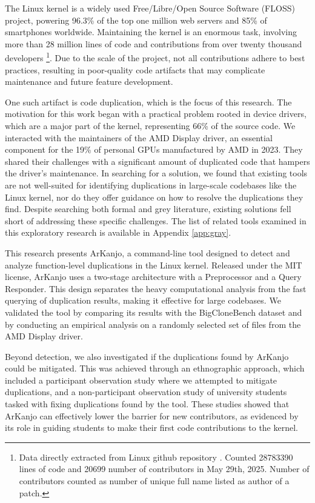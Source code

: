 \en

The Linux kernel is a widely used Free/Libre/Open Source Software (FLOSS) project, 
powering 96.3\% of the top one million web servers and 85\% of smartphones worldwide. 
Maintaining the kernel is an enormous task, involving more than 28 million lines of 
code and contributions from over twenty thousand developers
\footnote{Data directly extracted from Linux github repository \citep{linuxrepo}.
Counted  28783390 lines of code and 20699 number of contributors in May 29th, 2025.
Number of contributors counted as number of unique full name listed as author of a patch.}.
Due to the scale of the project, not all contributions adhere to best practices, resulting 
in poor-quality code artifacts that may complicate maintenance and future feature development.

One such artifact is code duplication, which is the focus of this research. The motivation for 
this work began with a practical problem rooted in device drivers, which are a major part 
of the kernel, representing 66\% of the source code\citep{marcelo}. We interacted with the 
maintainers of the AMD Display driver, an essential component for the 19\% of personal GPUs 
manufactured by AMD in 2023\citep{gpumarket}. They shared their challenges with a significant 
amount of duplicated code that hampers the driver's maintenance. In searching for a solution, 
we found that existing tools are not well-suited for identifying duplications in large-scale 
codebases like the Linux kernel, nor do they offer guidance on how to resolve the duplications 
they find. Despite searching both formal and grey literature, existing solutions fell short of 
addressing these specific challenges. The list of related tools examined in this exploratory 
research is available in Appendix \ref{app:gray}.

This research presents ArKanjo, a command-line tool designed to detect and analyze function-level 
duplications in the Linux kernel. Released under the MIT license, ArKanjo uses a two-stage 
architecture with a Preprocessor and a Query Responder. This design separates the heavy 
computational analysis from the fast querying of duplication results, making it effective for 
large codebases. We validated the tool by comparing its results with the BigCloneBench dataset
\citep{bigclonebench} and by conducting an empirical analysis on a randomly selected set of 
files from the AMD Display driver.

Beyond detection, we also investigated if the duplications found by ArKanjo could be mitigated.
This was achieved through an ethnographic approach, which included a participant observation 
study where we attempted to mitigate duplications, and a non-participant observation study of 
university students tasked with fixing duplications found by the tool. These studies showed that 
ArKanjo can effectively lower the barrier for new contributors, as evidenced by its role in 
guiding students to make their first code contributions to the kernel.

